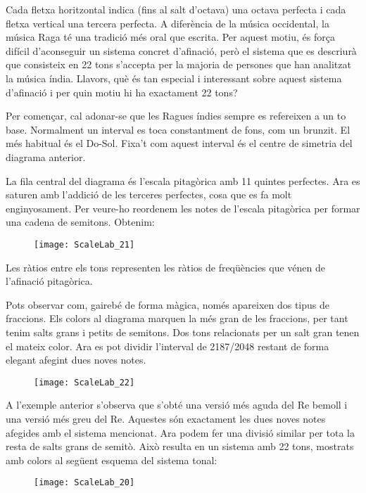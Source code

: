 Cada fletxa horitzontal indica (fins al salt d'octava) una octava perfecta i cada fletxa vertical una tercera perfecta. A diferència de la música occidental, la música Raga té una tradició més oral que escrita. Per aquest motiu, és força difícil d'aconseguir un sistema concret d'afinació, però el sistema que es descriurà que consisteix en 22 tons s'accepta per la majoria de persones que han analitzat la música índia. Llavors, què és tan especial i interessant sobre aquest sistema d'afinació i per quin motiu hi ha exactament 22 tons?  

Per començar, cal adonar-se que les Ragues índies sempre es refereixen a un to base. Normalment un interval es toca constantment de fons, com un brunzit. El més habitual és el Do-Sol. Fixa't com aquest interval és el centre de simetria del diagrama anterior. 

La fila central del diagrama és l'escala pitagòrica amb 11 quintes perfectes. Ara es saturen amb l'addició de les terceres perfectes, cosa que es fa molt enginyosament. Per veure-ho reordenem les notes de l'escala pitagòrica per formar una cadena de semitons. Obtenim:

\begin{figure}[h]
\centering
\texttt{[image: ScaleLab\_21]}
\end{figure}

Les ràtios entre els tons representen les ràtios de freqüències que vénen de l'afinació pitagòrica. 

Pots observar com, gairebé de forma màgica, només apareixen dos tipus de fraccions. Els colors al diagrama marquen la més gran de les fraccions, per tant tenim salts grans i petits de semitons. Dos tons relacionats per un salt gran tenen el mateix color. Ara es pot dividir l'interval de 2187/2048 restant de forma elegant afegint dues noves notes.  

\begin{figure}[h]
\centering
\texttt{[image: ScaleLab\_22]}
\end{figure}

A l'exemple anterior s'observa que s'obté una versió més aguda del Re bemoll i una versió més greu del Re. Aquestes són exactament les dues noves notes afegides amb el sistema mencionat. Ara podem fer una divisió similar per tota la resta de salts grans de semitò. Això resulta en un sistema amb 22 tons, mostrats amb colors al següent esquema del sistema tonal: 

\begin{figure}[h]
\centering
\texttt{[image: ScaleLab\_20]}
\end{figure}


